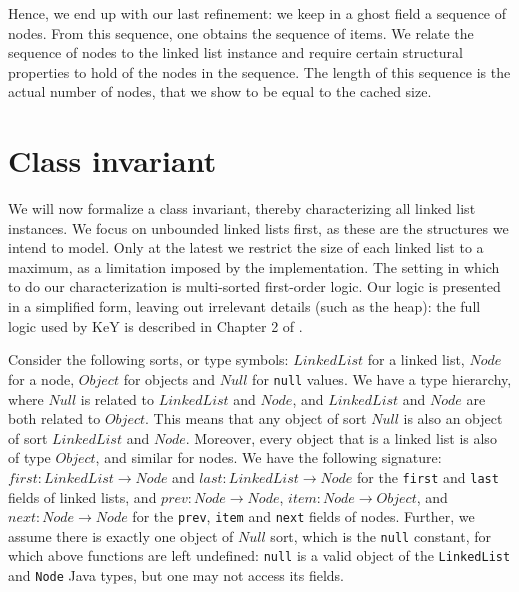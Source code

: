 \documentclass[runningheads]{llncs}
\theoremstyle{remark}
\begin{document}
Hence, we end up with our last refinement: we keep in a ghost field a sequence of nodes. From this sequence, one obtains the sequence of items. We relate the sequence of nodes to the linked list instance and require certain structural properties to hold of the nodes in the sequence. The length of this sequence is the actual number of nodes, that we show to be equal to the cached size.

%

\section{Class invariant}\label{sec:class-invariant}

We will now formalize a class invariant, thereby characterizing all linked list instances. We focus on unbounded linked lists first, as these are the structures we intend to model. Only at the latest we restrict the size of each linked list to a maximum, as a limitation imposed by the implementation. The setting in which to do our characterization is multi-sorted first-order logic. Our logic is presented in a simplified form, leaving out irrelevant details (such as the heap): the full logic used by KeY is described in Chapter 2 of \cite{KeYbook}.

Consider the following sorts, or type symbols: $\mathit{LinkedList}$ for a linked list, $\mathit{Node}$ for a node, $\mathit{Object}$ for objects and $\mathit{Null}$ for \texttt{null} values. We have a type hierarchy, where $\mathit{Null}$ is related to $\mathit{LinkedList}$ and $\mathit{Node}$, and $\mathit{LinkedList}$ and $\mathit{Node}$ are both related to $\mathit{Object}$. This means that any object of sort $\mathit{Null}$ is also an object of sort $\mathit{LinkedList}$ and $\mathit{Node}$. Moreover, every object that is a linked list is also of type $\mathit{Object}$, and similar for nodes.
We have the following signature: $\mathit{first}: \mathit{LinkedList}\to \mathit{Node}$ and $\mathit{last}: \mathit{LinkedList}\to \mathit{Node}$ for the \texttt{first} and \texttt{last} fields of linked lists, and $\mathit{prev}: \mathit{Node}\to \mathit{Node}$, $\mathit{item}: \mathit{Node}\to \mathit{Object}$, and $\mathit{next}: \mathit{Node}\to \mathit{Node}$ for the \texttt{prev}, \texttt{item} and \texttt{next} fields of nodes. Further, we assume there is exactly one object of $\mathit{Null}$ sort, which is the \texttt{null} constant, for which above functions are left undefined: \texttt{null} is a valid object of the \texttt{LinkedList} and \texttt{Node} Java types, but one may not access its fields.
\end{document}
